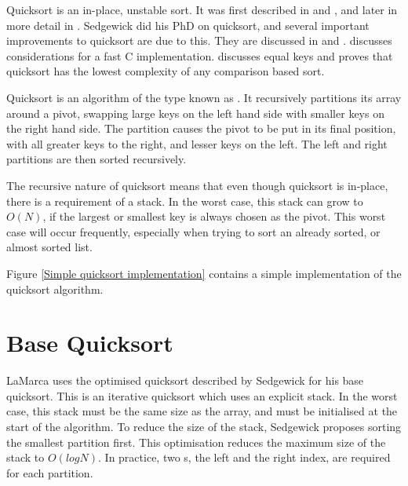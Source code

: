 
Quicksort is an in-place, unstable sort. It was first described in
\cite{HoarePartition61} and \cite{HoareQuicksort61}, and later in more detail in
\cite{Hoare62}. Sedgewick did his PhD on quicksort, and several important
improvements to quicksort are due to this. They are discussed in
\cite{Sedgewick78} and \cite{Sedgewick02}. \cite{BentleyMcIlroy93} discusses
considerations for a fast C implementation. \cite{SedgewickBentley02} discusses
equal keys and proves that quicksort has the lowest complexity of any comparison
based sort.

Quicksort is an algorithm of the type known as . It
recursively partitions its array around a pivot, swapping large keys on
the left hand side with smaller keys on the right hand side. The partition
causes the pivot to be put in its final position, with all greater keys to the
right, and lesser keys on the left. The left and right partitions are then
sorted recursively.

The recursive nature of quicksort means that even though quicksort is in-place,
there is a requirement of a stack. In the worst case, this stack can grow to
$O(N)$, if the largest or smallest key is always chosen as the pivot. This
worst case will occur frequently, especially when trying to sort an already
sorted, or almost sorted list.

Figure \vref{Simple quicksort implementation} contains a simple implementation of
the quicksort algorithm.


\section{Base Quicksort}

LaMarca uses the optimised quicksort described by Sedgewick for his base
quicksort. This is an iterative quicksort which uses an explicit stack. In the
worst case, this stack must be the same size as the array, and must be
initialised at the start of the algorithm. To reduce the size of the stack,
Sedgewick proposes sorting the smallest partition first. This optimisation
reduces the maximum size of the stack to $O(logN)$. In practice, two s,
the left and the right index, are required for each partition.


